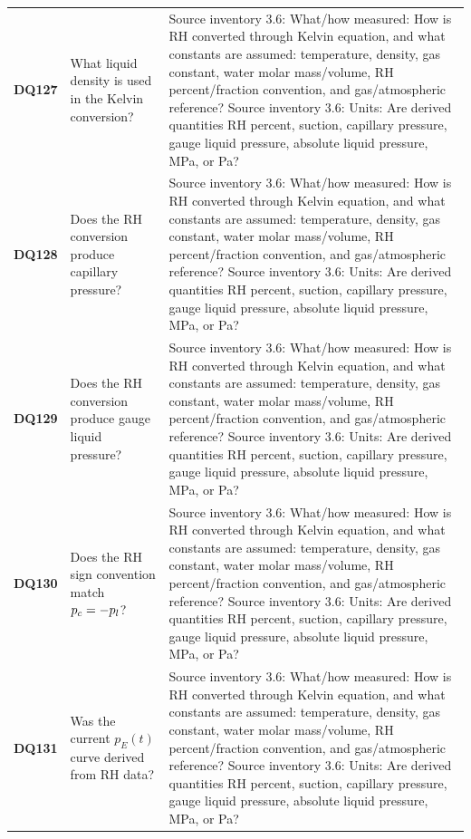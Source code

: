 \begin{longtable}{@{}L{0.09\textwidth} L{0.31\textwidth} L{0.52\textwidth}@{}}
\addlinespace[0.18em]
\textbf{DQ127} & What liquid density is used in the Kelvin conversion? & Source inventory 3.6: What/how measured: How is RH converted through Kelvin equation, and what constants are assumed: temperature, density, gas constant, water molar mass/volume, RH percent/fraction convention, and gas/atmospheric reference? Source inventory 3.6: Units: Are derived quantities RH percent, suction, capillary pressure, gauge liquid pressure, absolute liquid pressure, MPa, or Pa?\\
\addlinespace[0.18em]
\textbf{DQ128} & Does the RH conversion produce capillary pressure? & Source inventory 3.6: What/how measured: How is RH converted through Kelvin equation, and what constants are assumed: temperature, density, gas constant, water molar mass/volume, RH percent/fraction convention, and gas/atmospheric reference? Source inventory 3.6: Units: Are derived quantities RH percent, suction, capillary pressure, gauge liquid pressure, absolute liquid pressure, MPa, or Pa?\\
\addlinespace[0.18em]
\textbf{DQ129} & Does the RH conversion produce gauge liquid pressure? & Source inventory 3.6: What/how measured: How is RH converted through Kelvin equation, and what constants are assumed: temperature, density, gas constant, water molar mass/volume, RH percent/fraction convention, and gas/atmospheric reference? Source inventory 3.6: Units: Are derived quantities RH percent, suction, capillary pressure, gauge liquid pressure, absolute liquid pressure, MPa, or Pa?\\
\addlinespace[0.18em]
\textbf{DQ130} & Does the RH sign convention match \(p_c=-p_l\)? & Source inventory 3.6: What/how measured: How is RH converted through Kelvin equation, and what constants are assumed: temperature, density, gas constant, water molar mass/volume, RH percent/fraction convention, and gas/atmospheric reference? Source inventory 3.6: Units: Are derived quantities RH percent, suction, capillary pressure, gauge liquid pressure, absolute liquid pressure, MPa, or Pa?\\
\addlinespace[0.18em]
\textbf{DQ131} & Was the current \(p_E(t)\) curve derived from RH data? & Source inventory 3.6: What/how measured: How is RH converted through Kelvin equation, and what constants are assumed: temperature, density, gas constant, water molar mass/volume, RH percent/fraction convention, and gas/atmospheric reference? Source inventory 3.6: Units: Are derived quantities RH percent, suction, capillary pressure, gauge liquid pressure, absolute liquid pressure, MPa, or Pa?\\

\end{longtable}
